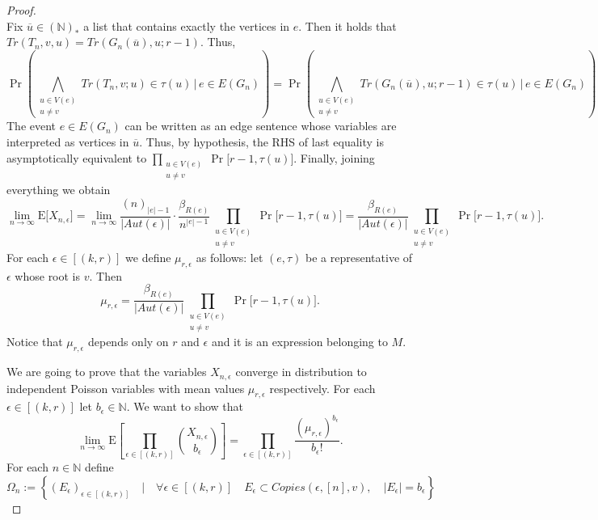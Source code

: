 \documentclass[12pt,notitlepage,a4paper]{article}
\theoremstyle{definition}
\newcommand{\N}{\mathbb{N}}
\newcommand{\Ln}{\lim\limits_{n\to \infty}}
\begin{document}
\begin{proof}
\[		\]
		Fix $\overline{u}\in (\N)_*$ a list that contains exactly the vertices
		in $e$. Then it holds that
		$Tr(T_{n}, v, u)=Tr(G_n(\overline{u}),u;r-1)$. 
		Thus,
		\[
		\Pr	\left(
		\bigwedge_{\substack{u\in V(e)\\ u\neq v} } Tr(T_{n}, v; u)\in \tau(u) 
		\, \Bigg| \,  e\in E(G_n) \right)
		=
		\Pr \left(
		\bigwedge_{\substack{u\in V(e)\\ u\neq v} } Tr(G_n(\overline{u}), u;
		r-1)\in \tau(u) \, \Bigg| \,  e\in E(G_n) \right)
		\]		
		The event $e\in E(G_n)$ can be written as an edge sentence
		whose variables are interpreted as vertices in $\overline{u}$.
		Thus, by hypothesis, the RHS of last equality
		is asymptotically equivalent to
		$\prod_{\substack{u\in V(e)\\ u\neq v} } \Pr\big[
		r-1, \tau(u)\big]$.
		Finally, joining everything we obtain
		\[
		\Ln
		\mathrm{E}\big[ X_{n,\epsilon} \big]
		= \Ln \frac{(n)_{|e|-1}}{|Aut(\epsilon)|}
		\cdot  \frac{\beta_{R(e)}}{n^{|e|-1}}
		\prod_{\substack{u\in V(e)\\ u\neq v} }
		\Pr\big[
		r-1, \tau(u)\big] =
		\frac{\beta_{R(e)}}{|Aut(\epsilon)|} 
		\prod_{\substack{u\in V(e)\\ u\neq v} } \Pr\big[
		r-1, \tau(u)\big].
		\]
		For each $\epsilon\in [(k,r)]$ we define $\mu_{r,\epsilon}$ 
		as follows: let $(e,\tau)$ be a representative of $\epsilon$
		whose root is $v$. Then
		\[
		\mu_{r,\epsilon}=\frac{\beta_{R(e)}}{|Aut(\epsilon)|} 
		\prod_{\substack{u\in V(e)\\ u\neq v} } \Pr\big[
		r-1, \tau(u)\big].
		\]
		Notice that $\mu_{r,\epsilon}$ depends only on $r$ and $\epsilon$
		and it is an expression belonging to $M$. \par
		We are going to prove that the variables $X_{n,\epsilon}$
		converge in distribution to independent Poisson variables 
		with mean values $\mu_{r,\epsilon}$ respectively. For
		each $\epsilon\in [(k,r)]$ let $b_\epsilon\in \N$. We want 
		to show that
		\begin{equation} \label{eqn:binomexpedges}
		\Ln
		\mathrm{E}
		\left[
		\prod_{\epsilon\in [(k,r)]} \binom{X_{n,\epsilon}}{b_\epsilon}	
		\right]
		= \prod_{\epsilon\in [(k,r)]} \frac{(\mu_{r,\epsilon})^
		{b_\epsilon}}{b_\epsilon!}.	
		\end{equation}
		For each $n\in \N$ define
		\[
		\Omega_n:=\left\{
		(E_\epsilon)_{\epsilon\in [(k,r)]} \quad 
		\Big | \quad \forall \epsilon\in [(k,r)] \quad
		E_\epsilon\subset Copies(\epsilon,[n],v), 
		\quad |E_\epsilon|=b_\epsilon	
		\right\}		
\]
\end{proof}
\end{document}
